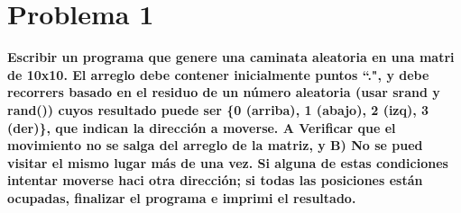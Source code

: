 \section*{Problema 1}
\textbf{Escribir un programa que genere una caminata aleatoria en una matri de 10x10. El arreglo debe contener inicialmente puntos ``.", y debe recorrers basado en el residuo de un número aleatoria (usar srand y rand()) cuyos resultado puede ser \{0 (arriba), 1 (abajo), 2 (izq), 3 (der)\}, que indican la dirección a moverse. A Verificar que el movimiento no se salga del arreglo de la matriz, y B) No se pued visitar el mismo lugar más de una vez. Si alguna de estas condiciones intentar moverse haci otra dirección; si todas las posiciones están ocupadas, finalizar el programa e imprimi el resultado.}
